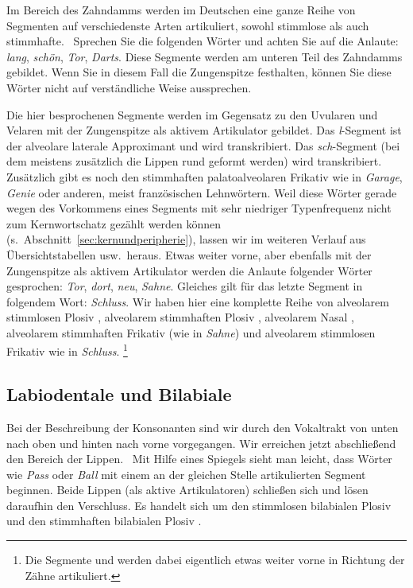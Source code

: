 
Im Bereich des Zahndamms werden im Deutschen eine ganze Reihe von Segmenten auf verschiedenste Arten artikuliert, sowohl stimmlose als auch stimmhafte.
\TuBegin~Sprechen Sie die folgenden Wörter und achten Sie auf die Anlaute: \textit{lang}, \textit{schön}, \textit{Tor}, \textit{Darts}.
Diese Segmente werden am unteren Teil des Zahndamms gebildet.
Wenn Sie in diesem Fall die Zungenspitze festhalten, können Sie diese Wörter nicht auf verständliche Weise aussprechen.

Die hier besprochenen Segmente werden im Gegensatz zu den Uvularen und Velaren mit der Zungenspitze als aktivem Artikulator gebildet.
Das \textit{l}-Segment ist der alveolare laterale Approximant und wird \textipa{[l]} transkribiert.
Das \textit{sch}-Segment (bei dem meistens zusätzlich die Lippen rund geformt werden) wird \textipa{[S]} transkribiert.
Zusätzlich gibt es noch den stimmhaften palatoalveolaren Frikativ \textipa{[Z]} wie in \textit{Garage}, \textit{Genie} oder anderen, meist französischen Lehnwörtern.
Weil diese Wörter gerade wegen des Vorkommens eines Segments mit sehr niedriger Typenfrequenz nicht zum Kernwortschatz gezählt werden können (s.\ Abschnitt~\ref{sec:kernundperipherie}), lassen wir \textipa{[Z]} im weiteren Verlauf aus Übersichtstabellen usw.\ heraus.
Etwas weiter vorne, aber ebenfalls mit der Zungenspitze als aktivem Artikulator werden die Anlaute folgender Wörter gesprochen: \textit{Tor}, \textit{dort}, \textit{neu}, \textit{Sahne}.
Gleiches gilt für das letzte Segment in folgendem Wort: \textit{Schluss}.
Wir haben hier eine komplette Reihe von alveolarem stimmlosen Plosiv \textipa{[t]}, alveolarem stimmhaften Plosiv \textipa{[d]}, alveolarem Nasal \textipa{[n]}, alveolarem stimmhaften Frikativ \textipa{[z]} (wie in \textit{Sahne}) und alveolarem stimmlosen Frikativ \textipa{[s]} wie in \textit{Schluss}.%
\footnote{Die Segmente \textipa{[s]} und \textipa{[z]} werden dabei eigentlich etwas weiter vorne in Richtung der Zähne artikuliert.}

\subsection{Labiodentale und Bilabiale}
\label{sec:labiodentaleundbilabiale}


Bei der Beschreibung der Konsonanten sind wir durch den Vokaltrakt von unten nach oben und hinten nach vorne vorgegangen.
Wir erreichen jetzt abschließend den Bereich der Lippen.
\TuBegin~Mit Hilfe eines Spiegels sieht man leicht, dass Wörter wie \textit{Pass} oder \textit{Ball} mit einem an der gleichen Stelle artikulierten Segment beginnen.
Beide Lippen (als aktive Artikulatoren) schließen sich und lösen daraufhin den Verschluss.
Es handelt sich um den stimmlosen bilabialen Plosiv \textipa{[p]} und den stimmhaften bilabialen Plosiv \textipa{[b]}.

